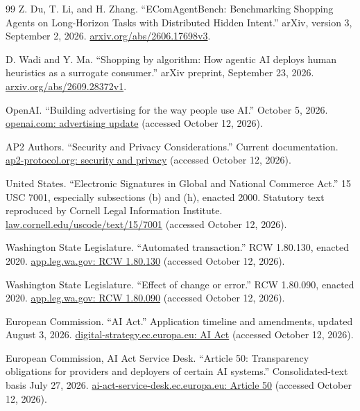 \documentclass{article}
\begin{document}
\begin{thebibliography}{99}
Z. Du, T. Li, and H. Zhang. ``EComAgentBench: Benchmarking Shopping Agents on Long-Horizon Tasks with Distributed Hidden Intent.'' arXiv, version 3, September 2, 2026. \href{https://arxiv.org/abs/2606.17698v3}{arxiv.org/abs/2606.17698v3}.

D. Wadi and Y. Ma. ``Shopping by algorithm: How agentic AI deploys human heuristics as a surrogate consumer.'' arXiv preprint, September 23, 2026. \href{https://arxiv.org/abs/2609.28372v1}{arxiv.org/abs/2609.28372v1}.

OpenAI. ``Building advertising for the way people use AI.'' October 5, 2026. \href{https://openai.com/index/new-chatgpt-ads-format-and-measurement/}{openai.com: advertising update} (accessed October 12, 2026).

AP2 Authors. ``Security and Privacy Considerations.'' Current documentation. \href{https://ap2-protocol.org/ap2/security_and_privacy_considerations/}{ap2-protocol.org: security and privacy} (accessed October 12, 2026).

United States. ``Electronic Signatures in Global and National Commerce Act.'' 15 USC 7001, especially subsections (b) and (h), enacted 2000. Statutory text reproduced by Cornell Legal Information Institute. \href{https://www.law.cornell.edu/uscode/text/15/7001}{law.cornell.edu/uscode/text/15/7001} (accessed October 12, 2026).

Washington State Legislature. ``Automated transaction.'' RCW 1.80.130, enacted 2020. \href{https://app.leg.wa.gov/RCW/default.aspx?cite=1.80.130}{app.leg.wa.gov: RCW 1.80.130} (accessed October 12, 2026).

Washington State Legislature. ``Effect of change or error.'' RCW 1.80.090, enacted 2020. \href{https://app.leg.wa.gov/RCW/default.aspx?cite=1.80.090}{app.leg.wa.gov: RCW 1.80.090} (accessed October 12, 2026).

European Commission. ``AI Act.'' Application timeline and amendments, updated August 3, 2026. \href{https://digital-strategy.ec.europa.eu/en/policies/regulatory-framework-ai}{digital-strategy.ec.europa.eu: AI Act} (accessed October 12, 2026).

European Commission, AI Act Service Desk. ``Article 50: Transparency obligations for providers and deployers of certain AI systems.'' Consolidated-text basis July 27, 2026. \href{https://ai-act-service-desk.ec.europa.eu/en/ai-act/article-50}{ai-act-service-desk.ec.europa.eu: Article 50} (accessed October 12, 2026).


\end{thebibliography}
\end{document}
